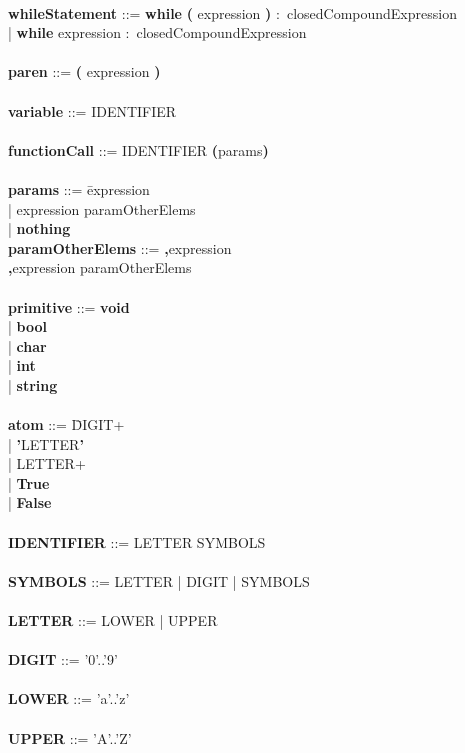 \begin{tabbing}
\\
{\bf whileStatement}              ::= \=\textbf{while} \textbf{(} expression \textbf{)} $\colon$ closedCompoundExpression\\
                                      \>| \textbf{while} expression $\colon$ closedCompoundExpression\\
\\ 
{\bf paren}                       ::= \textbf{(} expression \textbf{)}\\
\\   
{\bf variable}                    ::= IDENTIFIER \\
\\   
{\bf functionCall}                ::= IDENTIFIER \textbf{(}params\textbf{)} \\
\\
{\bf params}                      ::= \=expression\\
                                      \>| expression paramOtherElems\\
                                      \>| \textbf{nothing}
\\
{\bf paramOtherElems}             ::= \=\textbf{,}expression\\
                                      \>\textbf{,}expression paramOtherElems\\
\\    
{\bf primitive}                   ::= \=\textbf{void}\\
                                      \>| \textbf{bool}\\
                                      \>| \textbf{char}\\
                                      \>| \textbf{int}\\
                                      \>| \textbf{string}\\
\\ 
{\bf atom}                        ::= \=DIGIT+\\
                                      \>| \textbf{'}LETTER\textbf{'}\\
                                      \>| LETTER+\\
                                      \>| \textbf{True}\\
                                      \>| \textbf{False}\\
\\
{\bf IDENTIFIER}                  ::= LETTER SYMBOLS\\
\\
{\bf SYMBOLS}                     ::= LETTER | DIGIT | SYMBOLS\\
\\
{\bf LETTER}                      ::= LOWER | UPPER\\
\\
{\bf DIGIT}                       ::= '0'..'9'\\
\\
{\bf LOWER}                       ::= 'a'..'z'\\
\\     
{\bf UPPER}                       ::= 'A'..'Z'\\
\\
\end{tabbing}
